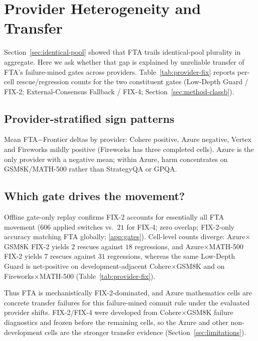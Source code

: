 \section{Provider Heterogeneity and Transfer}
\label{sec:provider-analysis}

Section~\ref{sec:identical-pool} showed that FTA trails identical-pool plurality in aggregate. Here
we ask whether that gap is explained by unreliable transfer of FTA's failure-mined gates across
providers. Table~\ref{tab:provider-fix} reports per-cell rescue/regression counts for the two
constituent gates (Low-Depth Guard / FIX-2; External-Consensus Fallback / FIX-4;
Section~\ref{sec:method-classb}).

\begin{table}[tbp]
\centering
\footnotesize
\setlength{\tabcolsep}{3pt}
\caption{Per-cell rescue/regression counts for FTA's gates (FIX-2 / FIX-4). Applied switches:
FIX-2~$606$, FIX-4~$21$, overlap~$0$. The table characterizes transfer of this failure-mined commit
rule.}
\label{tab:provider-fix}

\end{table}

\subsection{Provider-stratified sign patterns}

Mean FTA$-$Frontier deltas by provider: Cohere positive, Azure negative, Vertex and Fireworks
mildly positive (Fireworks has three completed cells). Azure is the only provider with a negative
mean; within Azure, harm concentrates on GSM8K/MATH-500 rather than StrategyQA or GPQA.

\subsection{Which gate drives the movement?}

Offline gate-only replay confirms FIX-2 accounts for essentially all FTA movement ($606$ applied
switches vs.\ $21$ for FIX-4; zero overlap; FIX-2-only accuracy matching FTA globally;
\ref{app:gates}). Cell-level counts diverge: Azure$\times$GSM8K FIX-2 yields $2$ rescues
against $18$ regressions, and Azure$\times$MATH-500 FIX-2 yields $7$ rescues against $31$
regressions, whereas the same Low-Depth Guard is net-positive on development-adjacent
Cohere$\times$GSM8K and on Fireworks$\times$MATH-500 (Table~\ref{tab:provider-fix}).

Thus FTA is mechanistically FIX-2-dominated, and Azure mathematics cells are concrete transfer
failures for this failure-mined commit rule under the evaluated provider shifts. FIX-2/FIX-4 were
developed from Cohere$\times$GSM8K failure diagnostics and frozen before the remaining cells, so
the Azure and other non-development cells are the stronger transfer evidence
(Section~\ref{sec:limitations}).
